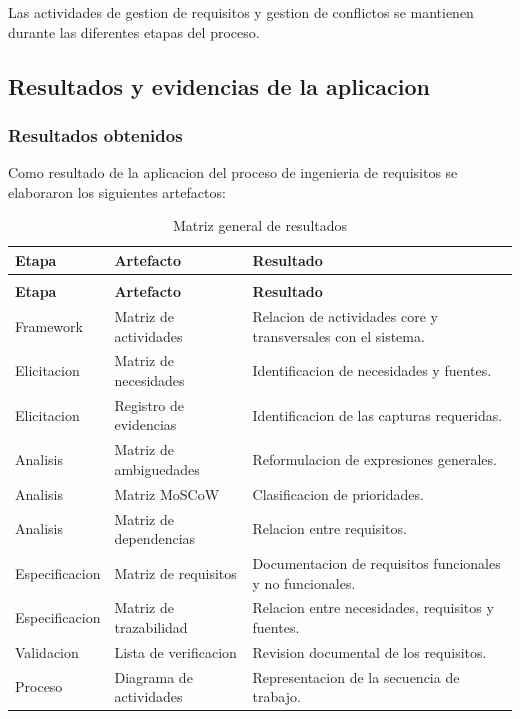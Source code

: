 \documentclass[12pt,a4paper]{article}
\renewcommand{\arraystretch}{1.17}
\begin{document}
Las actividades de gestion de requisitos y
gestion de conflictos se mantienen durante
las diferentes etapas del proceso.

\subsection{Resultados y evidencias de la aplicacion}

\subsubsection{Resultados obtenidos}

Como resultado de la aplicacion del proceso
de ingenieria de requisitos se elaboraron
los siguientes artefactos:

\begingroup
\footnotesize
\setlength{\tabcolsep}{3pt}
\renewcommand{\arraystretch}{1.25}
\begin{longtable}{|>{\raggedright\arraybackslash}p{2.65cm}|>{\raggedright\arraybackslash}p{6.05cm}|>{\raggedright\arraybackslash}p{5.65cm}|}
\caption{Matriz general de resultados}\\
\hline
\textbf{Etapa} &
\textbf{Artefacto} &
\textbf{Resultado} \\
\hline
\endfirsthead
\multicolumn{3}{c}{\textit{Continuación: Matriz general de resultados}}\\
\hline
\textbf{Etapa} &
\textbf{Artefacto} &
\textbf{Resultado} \\
\hline
\endhead
Framework &
Matriz de actividades &
Relacion de actividades core y transversales
con el sistema. \\
\hline
Elicitacion &
Matriz de necesidades &
Identificacion de necesidades y fuentes. \\
\hline
Elicitacion &
Registro de evidencias &
Identificacion de las capturas requeridas. \\
\hline
Analisis &
Matriz de ambiguedades &
Reformulacion de expresiones generales. \\
\hline
Analisis &
Matriz MoSCoW &
Clasificacion de prioridades. \\
\hline
Analisis &
Matriz de dependencias &
Relacion entre requisitos. \\
\hline
Especificacion &
Matriz de requisitos &
Documentacion de requisitos funcionales
y no funcionales. \\
\hline
Especificacion &
Matriz de trazabilidad &
Relacion entre necesidades, requisitos y fuentes. \\
\hline
Validacion &
Lista de verificacion &
Revision documental de los requisitos. \\
\hline
Proceso &
Diagrama de actividades &
Representacion de la secuencia de trabajo. \\
\hline
\end{longtable}
\endgroup
\end{document}
